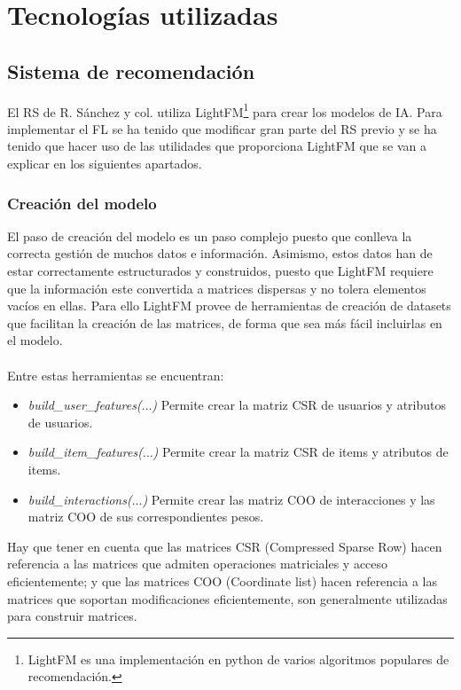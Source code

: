 \section{Tecnologías utilizadas}

\subsection{Sistema de recomendación}
El RS de R. Sánchez y col. utiliza LightFM\footnote{LightFM es una implementación en python de varios algoritmos populares de recomendación.} para crear los modelos de IA. Para implementar el FL se ha tenido que modificar gran parte del RS previo y se ha tenido que hacer uso de las utilidades que proporciona LightFM que se van a explicar en los siguientes apartados. 
\subsubsection{Creación del modelo}
El paso de creación del modelo es un paso complejo puesto que conlleva la correcta gestión de muchos datos e información. Asimismo, estos datos han de estar correctamente estructurados y construidos, puesto que LightFM requiere que la información este convertida a matrices dispersas y no tolera elementos vacíos en ellas. Para ello LightFM provee de herramientas de creación de datasets que facilitan la creación de las matrices, de forma que sea más fácil incluirlas en el modelo. 
\\ \\
Entre estas herramientas se encuentran:

\begin{itemize}
    \item \textit{build\_user\_features($\ldots$)} \quad Permite crear la matriz CSR de usuarios y atributos de usuarios.
    \item \textit{build\_item\_features($\ldots$)} \quad Permite crear la matriz CSR  de items y atributos de items.
    \item \textit{build\_interactions($\ldots$)} \quad Permite crear las matriz COO de interacciones y las matriz COO de sus correspondientes pesos.
\end{itemize}

Hay que tener en cuenta que las matrices CSR (Compressed Sparse Row) hacen referencia a las matrices que admiten operaciones matriciales y acceso eficientemente; y que las matrices COO (Coordinate list) hacen referencia a las matrices que soportan modificaciones eficientemente, son generalmente utilizadas para construir matrices.


